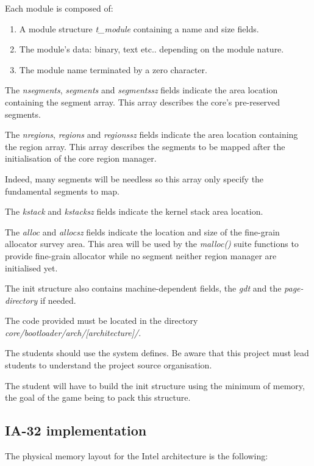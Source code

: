 Each module is composed of:

\begin{enumerate}
  \item
    A module structure \textit{t\_module} containing a name and size fields.
  \item
    The module's data: binary, text etc.. depending on the module nature.
  \item
    The module name terminated by a zero character.
\end{enumerate}

The \textit{nsegments}, \textit{segments} and \textit{segmentssz} fields
indicate the area location containing the segment array. This array
describes the core's pre-reserved segments.

The \textit{nregions}, \textit{regions} and \textit{regionssz} fields
indicate the area location containing the region array. This array
describes the segments to be mapped after the initialisation of the
core region manager.

Indeed, many segments will be needless so this array only specify the
fundamental segments to map.

The \textit{kstack} and \textit{kstacksz} fields indicate the kernel
stack area location.

The \textit{alloc} and \textit{allocsz} fields indicate the location
and size of the fine-grain allocator survey area. This area will be
used by the \textit{malloc()} suite functions to provide fine-grain
allocator while no segment neither region manager are initialised yet.

The  init  structure   also  contains  machine-dependent  fields,  the
\textit{gdt} and the \textit{page-directory} if needed.

The code provided must be located in the directory
\textit{core/bootloader/arch/[architecture]/}.

The students should use the system defines. Be aware that this project
must lead students to understand the project source organisation.

The student will have to build the init structure using the minimum
of memory, the goal of the game being to pack this structure.

%
%

\subsection{IA-32 implementation}

The physical memory layout for the Intel architecture is the following:

